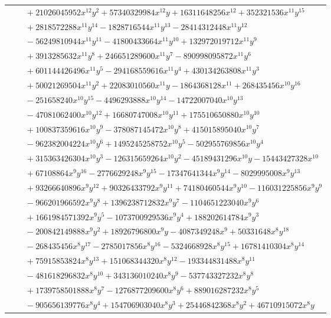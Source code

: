 \documentclass[11pt]{article}
\begin{document}
\begin{longtable}{@{}ll@{}}
 & $\quad +21026045952x^{12}y^{2}+57340329984x^{12}y+16311648256x^{12}+352321536x^{11}y^{15}$\\
 & $\quad +2818572288x^{11}y^{14}-1828716544x^{11}y^{13}-28414312448x^{11}y^{12}$\\
 & $\quad -56249810944x^{11}y^{11}-41800433664x^{11}y^{10}+132972019712x^{11}y^{9}$\\
 & $\quad +3913285632x^{11}y^{8}+246651289600x^{11}y^{7}-890998095872x^{11}y^{6}$\\
 & $\quad +601144426496x^{11}y^{5}-294168559616x^{11}y^{4}+430134263808x^{11}y^{3}$\\
 & $\quad +50021269504x^{11}y^{2}+22083010560x^{11}y-1864368128x^{11}+268435456x^{10}y^{16}$\\
 & $\quad -251658240x^{10}y^{15}-4496293888x^{10}y^{14}-14722007040x^{10}y^{13}$\\
 & $\quad -47081062400x^{10}y^{12}+16680747008x^{10}y^{11}+175510650880x^{10}y^{10}$\\
 & $\quad +100837359616x^{10}y^{9}-378087145472x^{10}y^{8}+415015895040x^{10}y^{7}$\\
 & $\quad -962382004224x^{10}y^{6}+1495245258752x^{10}y^{5}-502955769856x^{10}y^{4}$\\
 & $\quad +315363426304x^{10}y^{3}-126315659264x^{10}y^{2}-45189431296x^{10}y-15443427328x^{10}$\\
 & $\quad +67108864x^{9}y^{16}-2776629248x^{9}y^{15}-17347641344x^{9}y^{14}-8029995008x^{9}y^{13}$\\
 & $\quad +93266640896x^{9}y^{12}+90326433792x^{9}y^{11}+74180460544x^{9}y^{10}-116031225856x^{9}y^{9}$\\
 & $\quad -966201966592x^{9}y^{8}+1396238712832x^{9}y^{7}-1104651223040x^{9}y^{6}$\\
 & $\quad +1661984571392x^{9}y^{5}-1073700929536x^{9}y^{4}+188202614784x^{9}y^{3}$\\
 & $\quad -200842149888x^{9}y^{2}+18926796800x^{9}y-4087349248x^{9}+50331648x^{8}y^{18}$\\
 & $\quad -268435456x^{8}y^{17}-2785017856x^{8}y^{16}-5324668928x^{8}y^{15}+16781410304x^{8}y^{14}$\\
 & $\quad +75915853824x^{8}y^{13}+151068344320x^{8}y^{12}-193344831488x^{8}y^{11}$\\
 & $\quad -481618296832x^{8}y^{10}+343136010240x^{8}y^{9}-537743327232x^{8}y^{8}$\\
 & $\quad +1739758501888x^{8}y^{7}-1276877209600x^{8}y^{6}+889016287232x^{8}y^{5}$\\
 & $\quad -905656139776x^{8}y^{4}+154706903040x^{8}y^{3}+25446842368x^{8}y^{2}+46710915072x^{8}y$\\

\end{longtable}
\end{document}

